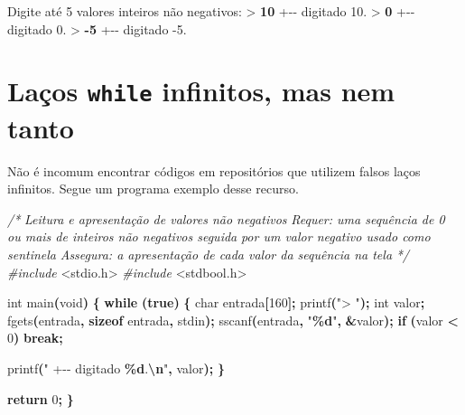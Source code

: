 \documentclass[
  11pt,
  a4paper,
]{scrbook}
\newenvironment{Shaded}{\begin{snugshade}}{\end{snugshade}}
\newcommand{\CommentTok}[1]{\textcolor[rgb]{0.56,0.35,0.01}{\textit{#1}}}
\newcommand{\ControlFlowTok}[1]{\textcolor[rgb]{0.13,0.29,0.53}{\textbf{#1}}}
\newcommand{\DataTypeTok}[1]{\textcolor[rgb]{0.13,0.29,0.53}{#1}}
\newcommand{\DecValTok}[1]{\textcolor[rgb]{0.00,0.00,0.81}{#1}}
\newcommand{\ImportTok}[1]{#1}
\newcommand{\KeywordTok}[1]{\textcolor[rgb]{0.13,0.29,0.53}{\textbf{#1}}}
\newcommand{\NormalTok}[1]{#1}
\newcommand{\OperatorTok}[1]{\textcolor[rgb]{0.81,0.36,0.00}{\textbf{#1}}}
\newcommand{\PreprocessorTok}[1]{\textcolor[rgb]{0.56,0.35,0.01}{\textit{#1}}}
\newcommand{\SpecialCharTok}[1]{\textcolor[rgb]{0.81,0.36,0.00}{\textbf{#1}}}
\newcommand{\StringTok}[1]{\textcolor[rgb]{0.31,0.60,0.02}{#1}}
\begin{document}
\begin{Shaded}
\begin{Highlighting}[]
\NormalTok{Digite até 5 valores inteiros não negativos:}
\NormalTok{\textgreater{} }\KeywordTok{ 10 }
\NormalTok{  +{-}{-} digitado 10.}
\NormalTok{\textgreater{} }\KeywordTok{ 0 }
\NormalTok{  +{-}{-} digitado 0.}
\NormalTok{\textgreater{} }\KeywordTok{ {-}5 }
\NormalTok{  +{-}{-} digitado {-}5.}
\end{Highlighting}
\end{Shaded}

\section{\texorpdfstring{Laços \texttt{while} infinitos, mas nem
tanto}{Laços while infinitos, mas nem tanto}}\label{sec-while-infinito}

Não é incomum encontrar códigos em repositórios que utilizem falsos
laços infinitos. Segue um programa exemplo desse recurso.

\begin{Shaded}
\begin{Highlighting}[]
\CommentTok{/*}
\CommentTok{Leitura e apresentação de valores não negativos}
\CommentTok{Requer: uma sequência de 0 ou mais de inteiros não negativos seguida}
\CommentTok{    por um valor negativo usado como sentinela}
\CommentTok{Assegura: a apresentação de cada valor da sequência na tela}
\CommentTok{*/}
\PreprocessorTok{\#include }\ImportTok{\textless{}stdio.h\textgreater{}}
\PreprocessorTok{\#include }\ImportTok{\textless{}stdbool.h\textgreater{}}

\DataTypeTok{int}\NormalTok{ main}\OperatorTok{(}\DataTypeTok{void}\OperatorTok{)} \OperatorTok{\{}
    \ControlFlowTok{while} \OperatorTok{(}\KeywordTok{true}\OperatorTok{)} \OperatorTok{\{}
        \DataTypeTok{char}\NormalTok{ entrada}\OperatorTok{[}\DecValTok{160}\OperatorTok{];}
\NormalTok{        printf}\OperatorTok{(}\StringTok{"\textgreater{} "}\OperatorTok{);}
        \DataTypeTok{int}\NormalTok{ valor}\OperatorTok{;}
\NormalTok{        fgets}\OperatorTok{(}\NormalTok{entrada}\OperatorTok{,} \KeywordTok{sizeof}\NormalTok{ entrada}\OperatorTok{,}\NormalTok{ stdin}\OperatorTok{);}
\NormalTok{        sscanf}\OperatorTok{(}\NormalTok{entrada}\OperatorTok{,} \StringTok{"}\SpecialCharTok{\%d}\StringTok{"}\OperatorTok{,} \OperatorTok{\&}\NormalTok{valor}\OperatorTok{);}
        \ControlFlowTok{if} \OperatorTok{(}\NormalTok{valor }\OperatorTok{\textless{}} \DecValTok{0}\OperatorTok{)}
            \ControlFlowTok{break}\OperatorTok{;}

\NormalTok{        printf}\OperatorTok{(}\StringTok{"  +{-}{-} digitado }\SpecialCharTok{\%d}\StringTok{.}\SpecialCharTok{\textbackslash{}n}\StringTok{"}\OperatorTok{,}\NormalTok{ valor}\OperatorTok{);}
    \OperatorTok{\}}

    \ControlFlowTok{return} \DecValTok{0}\OperatorTok{;}
\OperatorTok{\}}
\end{Highlighting}
\end{Shaded}
\end{document}
